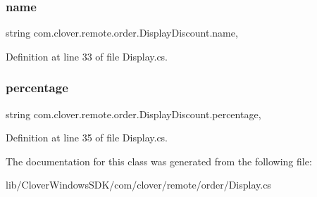 \subsubsection{\texorpdfstring{name}{name}}
{\footnotesize\ttfamily string com.\+clover.\+remote.\+order.\+Display\+Discount.\+name\hspace{0.3cm}{\ttfamily [get]}, {\ttfamily [set]}}



Definition at line 33 of file Display.\+cs.

\mbox{\label{classcom_1_1clover_1_1remote_1_1order_1_1_display_discount_a98f6bfed530a89d304b48cfd3f76ce6c}} 
\subsubsection{\texorpdfstring{percentage}{percentage}}
{\footnotesize\ttfamily string com.\+clover.\+remote.\+order.\+Display\+Discount.\+percentage\hspace{0.3cm}{\ttfamily [get]}, {\ttfamily [set]}}



Definition at line 35 of file Display.\+cs.



The documentation for this class was generated from the following file\+:\begin{DoxyCompactItemize}
\item 
lib/\+Clover\+Windows\+S\+D\+K/com/clover/remote/order/Display.\+cs\end{DoxyCompactItemize}
